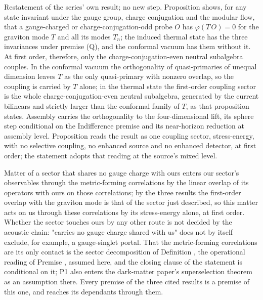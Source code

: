 Restatement of the series' own result; no new step. Proposition  shows, for any state invariant under the gauge group, charge conjugation and the modular flow, that a gauge-charged or charge-conjugation-odd probe $O$ has $\varphi(T\,O) = 0$ for the graviton mode $T$ and all its modes $T_{n}$; the induced thermal state has the three invariances under premise (Q), and the conformal vacuum has them without it. At first order, therefore, only the charge-conjugation-even neutral subalgebra couples. In the conformal vacuum the orthogonality of quasi-primaries of unequal dimension leaves $T$ as the only quasi-primary with nonzero overlap, so the coupling is carried by $T$ alone; in the thermal state the first-order coupling sector is the whole charge-conjugation-even neutral subalgebra, generated by the current bilinears and strictly larger than the conformal family of $T$, as that proposition states. Assembly  carries the orthogonality to the four-dimensional lift, its sphere step conditional on the Indifference premise and its near-horizon reduction at assembly level. Proposition  reads the result as one coupling sector, stress-energy, with no selective coupling, no enhanced source and no enhanced detector, at first order; the statement adopts that reading at the source's mixed level.

Matter of a sector that shares no gauge charge with ours enters our sector's observables through the metric-forming correlations by the linear overlap of its operators with ours on those correlations; by the three results the first-order overlap with the graviton mode is that of the sector just described, so this matter acts on us through these correlations by its stress-energy alone, at first order. Whether the sector touches ours by any other route is not decided by the acoustic chain: "carries no gauge charge shared with us" does not by itself exclude, for example, a gauge-singlet portal. That the metric-forming correlations are its only contact is the sector decomposition of Definition , the operational reading of Premise , assumed here, and the closing clause of the statement is conditional on it; P1 also enters the dark-matter paper's superselection theorem as an assumption there. Every premise of the three cited results is a premise of this one, and reaches its dependants through them.
